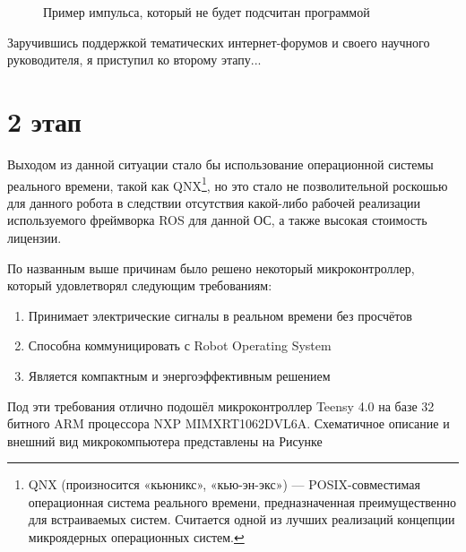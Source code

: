 \documentclass[12pt,a4paper]{scrartcl}
\begin{document}
			\begin{figure}[h]
				\caption{Пример импульса, который не будет подсчитан программой}
				\label{fig:Miscount}
			\end{figure}
			
			Заручившись поддержкой тематических интернет-форумов и своего научного руководителя, я приступил ко второму этапу...
			
		\section*{2 этап}
			Выходом из данной ситуации стало бы использование операционной системы реального времени, такой как QNX\footnote{QNX (произносится «кьюникс», «кью-эн-экс») — POSIX-совместимая операционная система реального времени, предназначенная преимущественно для встраиваемых систем. Считается одной из лучших реализаций концепции микроядерных операционных систем.}, но это стало не позволительной роскошью для данного робота в следствии отсутствия какой-либо рабочей реализации используемого фреймворка ROS для данной ОС, а также высокая стоимость лицензии.
			
			По названным выше причинам было решено некоторый микроконтроллер, который удовлетворял следующим требованиям:
			\begin{enumerate}
				\item Принимает электрические сигналы в реальном времени без просчётов
				\item Способна коммуницировать с Robot Operating System
				\item Является компактным и энергоэффективным решением
			\end{enumerate}
			
			Под эти требования отлично подошёл микроконтроллер Teensy 4.0 на базе 32 битного ARM процессора NXP MIMXRT1062DVL6A. Схематичное описание и внешний вид микрокомпьютера представлены на Рисунке 
			
\end{document}
